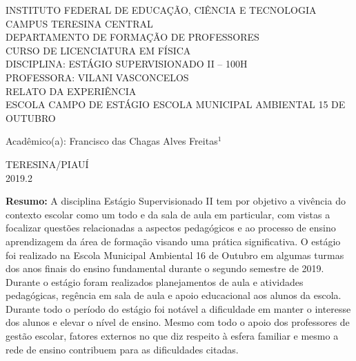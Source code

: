 \documentclass[a4paper,10pt]{article}
\begin{document}
  \begin{titlepage}
    \begin{center}
      {\large INSTITUTO FEDERAL DE EDUCAÇÃO, CIÊNCIA E TECNOLOGIA } \\[0.2cm]
      {\large CAMPUS TERESINA CENTRAL} \\[0.2cm]
      {\large DEPARTAMENTO DE FORMAÇÃO DE PROFESSORES} \\[0.2cm]
      {\large CURSO DE LICENCIATURA EM FÍSICA} \\[0.2cm]
      {\large DISCIPLINA: ESTÁGIO SUPERVISIONADO II – 100H} \\[0.2cm]
      {\large PROFESSORA: VILANI VASCONCELOS} \\[5.0cm]

      RELATO DA EXPERIÊNCIA \\[0.5cm]
      ESCOLA CAMPO DE ESTÁGIO ESCOLA MUNICIPAL AMBIENTAL 15 DE OUTUBRO\\[2.0cm]
    \end{center}
    
    \begin{flushright}
      Acadêmico(a): Francisco das Chagas Alves Freitas$^{1}$ \\[5.0cm]
    \end{flushright}
      
    \begin{center}
      TERESINA/PIAUÍ \\
      2019.2
    \end{center}
    
  \end{titlepage}
  \textbf{Resumo:} A disciplina Estágio Supervisionado II tem por objetivo a vivência do contexto escolar como um todo e da sala 
  de aula em particular, com vistas a focalizar questões relacionadas a aspectos pedagógicos e ao processo de ensino aprendizagem 
  da área de formação visando uma prática significativa. O estágio foi realizado na Escola Municipal Ambiental 16 de Outubro 
  em algumas turmas dos anos finais do ensino fundamental durante o segundo semestre de 2019. Durante o estágio foram realizados 
  planejamentos de aula e atividades pedagógicas, regência em sala de aula e apoio educacional aos alunos da escola. Durante todo 
  o período do estágio foi notável a dificuldade em manter o interesse dos alunos e elevar o nível de ensino. Mesmo com todo o apoio
  dos professores de gestão escolar, fatores externos no que diz respeito à esfera familiar e mesmo a rede de ensino contribuem 
  para as dificuldades citadas.
  
\end{document}

